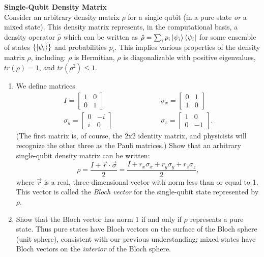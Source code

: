 \documentclass[12pt,letterpaper,boxed,cm]{hmcpset}
\begin{document}

\begin{problem}[1.]
    \textbf{Single-Qubit Density Matrix}\\
    Consider an arbitrary density matrix $\rho$ for a single qubit (in a pure state \textit{or} a mixed state).  This density matrix represents, in the computational basis, a density operator $\hat{\rho}$ which can be written as $\hat{\rho} = \sum_{i} p_i\ket{\psi_i}\bra{\psi_i}$ for some ensemble of states $\{\ket{\psi_i}\}$ and probabilities $p_i$.  This implies various properties of the density matrix $\rho$, including: $\rho$ is Hermitian, $\rho$ is diagonalizable with positive eigenvalues, $tr(\rho)=1$, and $tr(\rho^2)\leq 1$.
    \begin{enumerate}[label=(\alph*)]
        \item We define matrices
        \begin{align}
            I = \begin{bmatrix} 1 & 0 \\ 0 & 1 \end{bmatrix} \hspace{1in}
            &\sigma_x = \begin{bmatrix} 0 & 1 \\ 1 & 0 \end{bmatrix} \nonumber \\
            \sigma_y = \begin{bmatrix} 0 & -i \\ i & 0 \end{bmatrix} \hspace{1in}
            &\sigma_z = \begin{bmatrix} 1 & 0 \\ 0 & -1 \end{bmatrix} \nonumber.
        \end{align}
        (The first matrix is, of course, the 2x2 identity matrix, and physicists will recognize the other three as the Pauli matrices.)  Show that an arbitrary single-qubit density matrix can be written:
        \[
            \rho = \frac{I+\vec{r}\cdot\vec{\sigma}}{2} = \frac{I+r_x\sigma_x + r_y\sigma_y + r_z\sigma_z}{2},
        \]
        where $\vec{r}$ is a real, three-dimensional vector with norm less than or equal to 1.  This vector is called the \textit{Bloch vector} for the single-qubit state represented by $\rho$.
        \item Show that the Bloch vector has norm 1 if and only if $\rho$ represents a pure state.  Thus pure states have Bloch vectors on the surface of the Bloch sphere (unit sphere), consistent with our previous understanding; mixed states have Bloch vectors on the \textit{interior} of the Bloch sphere. 
    \end{enumerate}
\end{problem}
\end{document}
